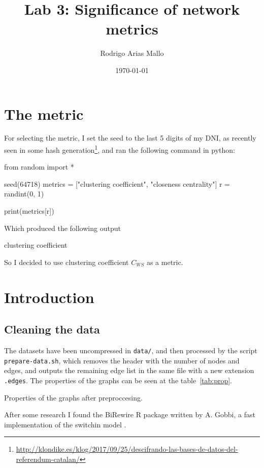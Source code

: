 \documentclass[a4paper]{article}
\title{Lab 3: Significance of network metrics}
\author{Rodrigo Arias Mallo}
\date{\today}
\begin{document}
\maketitle

\section{The metric}

For selecting the metric, I set the seed to the last 5 digits of my DNI, as 
recently seen in some hash generation\footnote{	
\url{http://klondike.es/klog/2017/09/25/descifrando-las-bases-de-datos-del-referendum-catalan/}}, 
and ran the following command in python:
%
\begin{pycode}
from random import *

seed(64718)
metrics = ["clustering coefficient", "closeness centrality"]
r = randint(0, 1)

print(metrics[r])
\end{pycode}
%
Which produced the following output
%
\begin{textcode}
clustering coefficient
\end{textcode}
%
So I decided to use clustering coefficient $C_{WS}$ as a metric.

\section{Introduction}

\subsection{Cleaning the data}

The datasets have been uncompressed in \texttt{data/}, and then processed by the 
script \texttt{prepare-data.sh}, which removes the header with the number of 
nodes and edges, and outputs the remaining edge list in the same file with a new 
extension \texttt{.edges}. The properties of the graphs can be seen at the 
table~\ref{tab:prop}.

\begin{table}[h]
	\centering
	
	\caption{Properties of the graphs after preproccesing.}
	\label{tab:prop}
\end{table}

After some research I found the BiRewire R package \cite{birewire} written by A.  
Gobbi, a fast implementation of the switchin model \cite{gobbi14} 
\cite{gobbi17}.
\end{document}
